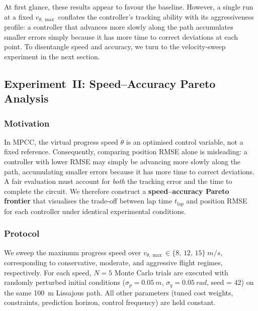 At first glance, these results appear to favour the baseline.
However, a single run at a fixed $v_{\theta,\max}$ conflates
the controller's tracking ability with its aggressiveness profile:
a controller that advances more slowly along the path accumulates
smaller errors simply because it has more time to correct
deviations at each point.
To disentangle speed and accuracy, we turn to the
velocity-sweep experiment in the next section.


\subsection{Experiment~II: Speed–Accuracy Pareto Analysis}
\label{sec:exp2}

\subsubsection{Motivation}

In MPCC, the virtual progress speed $\dot\theta$ is an optimised
control variable, not a fixed reference.
Consequently, comparing position RMSE alone is misleading:
a controller with lower RMSE may simply be advancing more
slowly along the path, accumulating smaller errors because
it has more time to correct deviations.
A fair evaluation must account for \emph{both} the tracking
error and the time to complete the circuit.
We therefore construct a \textbf{speed–accuracy Pareto frontier}
that visualises the trade-off between lap time
$t_{\text{lap}}$ and position RMSE for each controller
under identical experimental conditions.


\subsubsection{Protocol}

We sweep the maximum progress speed over
$v_{\theta,\max} \in \{8,\,12,\,15\}\;\si{m/s}$,
corresponding to conservative, moderate, and aggressive
flight regimes, respectively.
For each speed, $N = 5$ Monte Carlo trials are executed
with randomly perturbed initial conditions
($\sigma_p = \SI{0.05}{m}$, $\sigma_q = \SI{0.05}{rad}$,
 seed = 42)
on the same \SI{100}{m} Lissajous path.
All other parameters (tuned cost weights, constraints,
prediction horizon, control frequency) are held constant.

